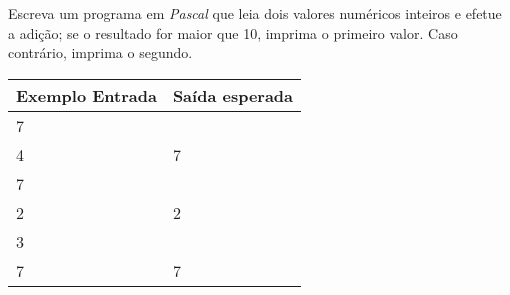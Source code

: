 \item Escreva um programa em \emph{Pascal} que leia dois valores numéricos 
inteiros e efetue a adição; se o resultado for maior que 10, imprima o 
primeiro valor. Caso contrário, imprima o segundo.

\begin{center}
\begin{tabular}{|l|l|} \hline
Exemplo Entrada & Saída esperada \\ \hline
7                &                \\
4                &   7             \\ \hline
7                &                \\
2                &   2             \\ \hline
3                &                \\
7                &   7             \\ \hline
\end{tabular}
\end{center}
